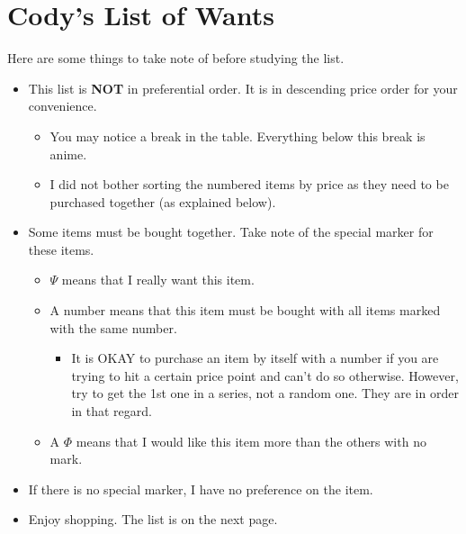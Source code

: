 \documentclass[12pt]{article}
\begin{document}
\section*{Cody's List of Wants}
Here are some things to take note of before studying the list.
\begin{itemize}
\item This list is \textbf{NOT} in preferential order. It is in descending price order for your convenience.
\begin{itemize}
\item You may notice a break in the table. Everything below this break is anime.
\item I did not bother sorting the numbered items by price as they need to be purchased together (as explained below).
\end{itemize}
\item Some items must be bought together. Take note of the special marker for these items.
\begin{itemize}
\item $\Psi$ means that I really want this item.
\item A number means that this item must be bought with all items marked with the same number.
\begin{itemize}
\item It is OKAY to purchase an item by itself with a number if you are trying to hit a certain price point and can't do so otherwise. However, try to get the 1st one in a series, not a random one. They are in order in that regard.
\end{itemize}
\item A $\Phi$ means that I would like this item more than the others with no mark.
\end{itemize}
\item If there is no special marker, I have no preference on the item.
\item Enjoy shopping. The list is on the next page.
\end{itemize}
\newpage
\end{document}
